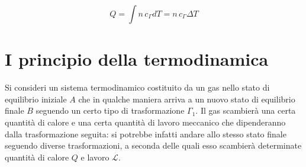 \[
	Q=\int n\,c_{\Gamma}dT = n\,c_{\Gamma}\Delta T
\]

\section{I principio della termodinamica}

Si consideri un sistema termodinamico costituito da un gas nello stato di equilibrio iniziale $A$ che in qualche maniera arriva a un nuovo stato di equilibrio finale $B$ seguendo un certo tipo di trasformazione $\Gamma_1$. Il gas scambierà una certa quantità di calore e una certa quantità di lavoro meccanico che dipenderanno dalla trasformazione seguita: si potrebbe infatti andare allo stesso stato finale seguendo diverse trasformazioni, a seconda delle quali esso scambierà determinate quantità di calore $Q$ e lavoro $\mathcal{L}$.

